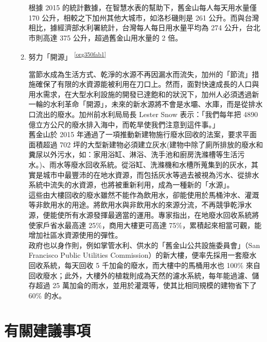 \documentclass[a4paper,12pt]{article}
\begin{document}
\begin{enumerate}
\begin{enumerate}
根據 2015 的統計數據，在智慧水表的幫助下，舊金山每人每天用水量僅 170 公升，相較之下加州其他大城市，如洛杉磯則是 261 公升。而與台灣相比，據經濟部水利署統計，台灣每人每日用水量平均為 274 公升，台北市則高達 375 公升，超過舊金山用水量的 2 倍。\\

\item 努力「開源」 \textsuperscript{\ref{org350fab1}}
\label{sec:org8b65328}

當節水成為生活方式、乾淨的水源不再因漏水而流失，加州的「節流」措施確保了有限的水資源能被利用在刀口上。然而，面對快速成長的人口與用水需求，在大型水利設施的開發已達飽和的狀況下，加州人必須透過新一輪的水利革命「開源」，未來的新水源將不會是水壩、水庫，而是從排水口流出的廢水。加州前水利局局長 Lester Snow 表示：「我們每年把 4890 億立方公尺的廢水排入海中，而乾旱使我們注意到這件事。」\\

舊金山於 2015 年通過了一項推動新建物施行廢水回收的法案，要求平面面積超過 702 坪的大型新建物必須建立灰水(建物中除了廁所排放的廢水和糞尿以外污水，如：家用浴缸、淋浴、洗手池和廚房洗滌槽等生活污水。)、雨水等廢水回收系統。從浴缸、洗滌機和水槽所蒐集到的灰水，其實是城市中最豐沛的在地水資源，而包括灰水等過去被視為污水、從排水系統中流失的水資源，也將被重新利用，成為一種新的「水源」。\\

這些由大樓回收的廢水雖然不能作為飲用水，卻能使用於馬桶沖水、灌溉等非飲用水的用途。將飲用水與非飲用水的來源分流，不再競爭乾淨水源，便能使所有水源發揮最適當的運用。專家指出，在地廢水回收系統將使家戶省水最高達 25\%，商用大樓更可高達 75\%，累積起來相當可觀，能增加社區水資源使用的彈性。\\

政府也以身作則，例如掌管水利、供水的「舊金山公共設施委員會」（San Francisco Public Utilities Commission）的新大樓，便率先採用一套廢水回收系統，每天回收 5 千加侖的廢水，而大樓中的馬桶用水也 100\% 來自回收廢水；此外，大樓外的植栽則成為天然的濾水系統，每年能過濾、儲存超過 25 萬加侖的雨水，並用於灌溉等，使其比相同規模的建物省下了 60\% 的水。\\

\newpage
\end{enumerate}
\end{enumerate}

\section{有關建議事項}
\label{sec:org4eda5ac}
\end{document}
